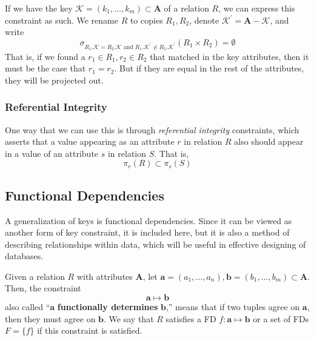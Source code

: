     \begin{definition}
      If we have the key $\mathcal{K} = (k_1, \ldots, k_m) \subset \mathbf{A}$ of a relation $R$, we can express this constraint as such. We rename $R$ to copies $R_1, R_2$, denote $\mathcal{K}^\prime = \mathbf{A} - \mathcal{K}$, and write 
      \begin{equation}
        \sigma_{R_1.\mathcal{K} = R_2.\mathcal{K} \text{ and } R_1.\mathcal{K}^\prime \neq R_2.\mathcal{K}^\prime} (R_1 \times R_2) = \emptyset
      \end{equation}
      That is, if we found a $r_1 \in R_1, r_2 \in R_2$ that matched in the key attributes, then it must be the case that $r_1 = r_2$. But if they are equal in the rest of the attributes, they will be projected out. 
    \end{definition}

  \subsubsection{Referential Integrity}

    \begin{definition}
      One way that we can use this is through \textit{referential integrity} constraints, which asserts that a value appearing as an attribute $r$ in relation $R$ also should appear in a value of an attribute $s$ in relation $S$. That is, 
      \begin{equation}
        \pi_r (R) \subset \pi_s (S)
      \end{equation}
    \end{definition}

\subsection{Functional Dependencies} 

    A generalization of keys is functional dependencies. Since it can be viewed as another form of key constraint, it is included here, but it is also a method of describing relationships within data, which will be useful in effective designing of databases.  

    \begin{definition}
      Given a relation $R$ with attributes $\mathbf{A}$, let $\mathbf{a} = (a_1, \ldots, a_n), \mathbf{b} = (b_1, \ldots, b_m) \subset \mathbf{A}$. Then, the constraint 
      \begin{equation}
        \mathbf{a} \mapsto \mathbf{b}
      \end{equation}
      also called ``$\mathbf{a}$ \textbf{functionally determines} $\mathbf{b}$,'' means that if two tuples agree on $\mathbf{a}$, then they must agree on $\mathbf{b}$. We say that $R$ satisfies a FD $f: \mathbf{a} \mapsto \mathbf{b}$ or a set of FDs $F = \{f\}$ if this constraint is satisfied. 
    \end{definition}

